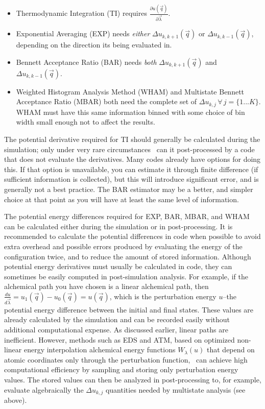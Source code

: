 \documentclass[9pt,bestpractices]{livecoms}
\begin{document}
\begin{itemize}
    \item Thermodynamic Integration (TI) requires $\frac{\partial u(\vec{q})}{\partial\vec{\lambda}}$.
    \item Exponential Averaging (EXP) needs \textit{either} $\Delta u_{k,k+1}(\vec{q})$ or $\Delta u_{k,k-1}(\vec{q})$, depending on the direction its being evaluated in.
    \item Bennett Acceptance Ratio (BAR) needs \textit{both} $\Delta u_{k,k+1}(\vec{q})$ and $\Delta u_{k,k-1}(\vec{q})$.
    \item Weighted Histogram Analysis Method (WHAM) and Multistate Bennett Acceptance Ratio (MBAR) both need the complete set of $\Delta u_{k,j} \, \forall \, j=\{1...K\}$. WHAM must have this same information binned with some choice of bin width small enough not to affect the results.
\end{itemize}

The potential derivative required for TI should generally be calculated during the simulation; only under very rare circumstances~\cite{naden2015linear} can it post-processed by a code that does not evaluate the derivatives. Many codes already have options for doing this.
If that option is unavailable, you can estimate it through finite difference (if sufficient information is collected), but this will introduce significant error, and is generally not a best practice. The BAR estimator may be a better, and simpler choice at that point as you will have at least the same level of information. 

The potential energy differences required for EXP, BAR, MBAR, and WHAM can be calculated either during the simulation or in post-processing. It is recommended to calculate the potential differences in code when possible to avoid extra overhead and possible errors produced by evaluating the energy of the configuration twice, and to reduce the amount of stored information. 
Although potential energy derivatives must usually be calculated in code, they can sometimes be easily computed in post-simulation analysis. 
For example, if the alchemical path you have chosen is a linear alchemical path, then $\frac{du}{d\vec{\lambda}} = u_1(\vec{q}) - u_0(\vec{q}) = u(\vec{q})$, which is the perturbation energy $u$--the potential energy difference between the initial and final states. These values are already calculated by the simulation and can be recorded easily without additional computational expense. As discussed earlier, linear paths are inefficient. However, methods such as EDS and ATM, based on optimized non-linear energy interpolation alchemical energy functions $W_\lambda(u)$ that depend on atomic coordinates only through the perturbation function,~\cite{konig2021efficient,azimi2022relative} can achieve high computational efficiency by sampling and storing only perturbation energy values. The stored values can then be analyzed in post-processing to, for example, evaluate algebraically the $\Delta u_{k,j}$ quantities needed by multistate analysis (see above). 
\end{document}
